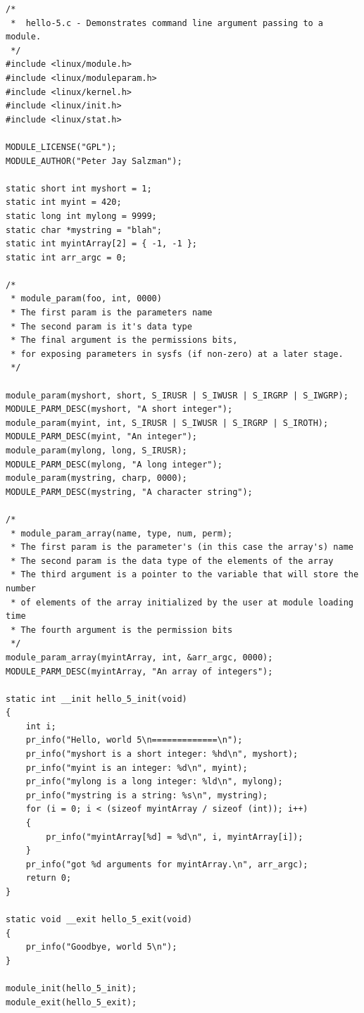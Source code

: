 \documentclass[11pt]{article}
\begin{document}
\begin{verbatim}
/*
 *  hello-5.c - Demonstrates command line argument passing to a module.
 */
#include <linux/module.h>
#include <linux/moduleparam.h>
#include <linux/kernel.h>
#include <linux/init.h>
#include <linux/stat.h>

MODULE_LICENSE("GPL");
MODULE_AUTHOR("Peter Jay Salzman");

static short int myshort = 1;
static int myint = 420;
static long int mylong = 9999;
static char *mystring = "blah";
static int myintArray[2] = { -1, -1 };
static int arr_argc = 0;

/*
 * module_param(foo, int, 0000)
 * The first param is the parameters name
 * The second param is it's data type
 * The final argument is the permissions bits,
 * for exposing parameters in sysfs (if non-zero) at a later stage.
 */

module_param(myshort, short, S_IRUSR | S_IWUSR | S_IRGRP | S_IWGRP);
MODULE_PARM_DESC(myshort, "A short integer");
module_param(myint, int, S_IRUSR | S_IWUSR | S_IRGRP | S_IROTH);
MODULE_PARM_DESC(myint, "An integer");
module_param(mylong, long, S_IRUSR);
MODULE_PARM_DESC(mylong, "A long integer");
module_param(mystring, charp, 0000);
MODULE_PARM_DESC(mystring, "A character string");

/*
 * module_param_array(name, type, num, perm);
 * The first param is the parameter's (in this case the array's) name
 * The second param is the data type of the elements of the array
 * The third argument is a pointer to the variable that will store the number
 * of elements of the array initialized by the user at module loading time
 * The fourth argument is the permission bits
 */
module_param_array(myintArray, int, &arr_argc, 0000);
MODULE_PARM_DESC(myintArray, "An array of integers");

static int __init hello_5_init(void)
{
    int i;
    pr_info("Hello, world 5\n=============\n");
    pr_info("myshort is a short integer: %hd\n", myshort);
    pr_info("myint is an integer: %d\n", myint);
    pr_info("mylong is a long integer: %ld\n", mylong);
    pr_info("mystring is a string: %s\n", mystring);
    for (i = 0; i < (sizeof myintArray / sizeof (int)); i++)
    {
        pr_info("myintArray[%d] = %d\n", i, myintArray[i]);
    }
    pr_info("got %d arguments for myintArray.\n", arr_argc);
    return 0;
}

static void __exit hello_5_exit(void)
{
    pr_info("Goodbye, world 5\n");
}

module_init(hello_5_init);
module_exit(hello_5_exit);
\end{verbatim}
\end{document}
